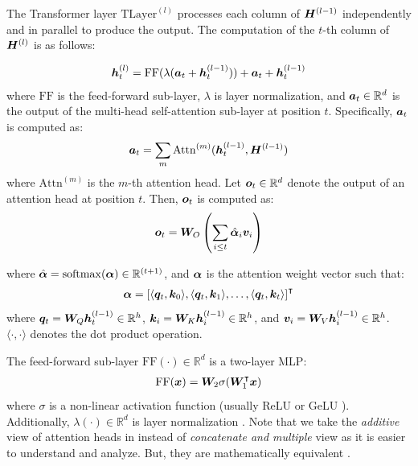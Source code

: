 \documentclass{article}
\begin{document}
The Transformer layer $\mathrm{TLayer}^{(l)}$ processes each column of ${\bm{H}}^{(l-1)}$ independently and in parallel to produce the output. The computation of the $t$-th column of ${\bm{H}}^{(l)}$ is as follows:

\begin{align}
  {\bm{h}}_t^{(l)} = \mathrm{FF}(\lambda({\bm{a}}_t + {\bm{h}}_t^{(l-1)})) + {\bm{a}}_t + {\bm{h}}_t^{(l-1)}
\end{align}
where $\mathrm{FF}$ is the feed-forward sub-layer, $\lambda$ is layer normalization, and ${\bm{a}}_t \in \mathbb{R}^d$ is the output of the multi-head self-attention sub-layer at position $t$. Specifically, ${\bm{a}}_t$ is computed as:
\begin{align}
  \label{eq:multi_head_attention}
  {\bm{a}}_t = \sum_{m} \mathrm{Attn}^{(m)}({\bm{h}}_t^{(l-1)}, {\bm{H}}^{(l-1)})
\end{align}
where $\mathrm{Attn}^{(m)}$ is the $m$-th attention head. Let ${\bm{o}}_t \in \mathbb{R}^d$ denote the output of an attention head at position $t$. Then, ${\bm{o}}_t$ is computed as:
\begin{align}
  \label{eq:attention_head}
  {\bm{o}}_t = {\bm{W}}_O \left(\sum_{i\le t} \hat{{\bm{\alpha}}}_i{\bm{v}}_i \right)
\end{align}

where $\hat{{\bm{\alpha}}} = \mathrm{softmax}({\bm{\alpha}}) \in \mathbb{R}^{(t+1)}$, and ${\bm{\alpha}}$ is the attention weight vector such that:
\begin{align}
  \label{eq:attention_weight}
  {\bm{\alpha}} = \left[\langle {\bm{q}}_t, {\bm{k}}_0 \rangle, \langle {\bm{q}}_t, {\bm{k}}_1 \rangle, \ldots, \langle {\bm{q}}_t, {\bm{k}}_t \rangle \right]^\intercal
\end{align}
where ${\bm{q}}_t = {\bm{W}}_Q {\bm{h}}_t^{(l-1)} \in \mathbb{R}^h$, ${\bm{k}}_i = {\bm{W}}_K {\bm{h}}_i^{(l-1)} \in \mathbb{R}^h$, and ${\bm{v}}_i = {\bm{W}}_V {\bm{h}}_i^{(l-1)} \in \mathbb{R}^h$. $\langle \cdot, \cdot \rangle$ denotes the dot product operation.

The feed-forward sub-layer $\mathrm{FF}(\cdot) \in \mathbb{R}^d$ is a two-layer MLP:
\begin{align}
  \label{eq:ff_sublayer}
  \mathrm{FF}({\bm{x}}) = {\bm{W}}_2 \sigma({\bm{W}}_1^\intercal {\bm{x}})
\end{align}
where $\sigma$ is a non-linear activation function (usually ReLU or GeLU \citep{Hendrycks2020:GeLU}).
Additionally, $\lambda(\cdot) \in \mathbb{R}^d$ is layer normalization \citep{Ba2016:LayerNorm}.
Note that we take the \emph{additive} \citep{Elhage2021:TransformerCircuits} view of attention heads in  instead of \emph{concatenate and multiple} view \citep{Vaswani2017:Transformer} as it is easier to understand and analyze. But, they are mathematically equivalent \citep{Elhage2021:TransformerCircuits}.
\end{document}
